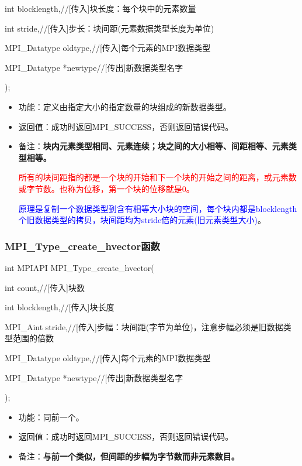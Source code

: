 \documentclass[UTF8]{article}%
\begin{document}
    \qquad int          blocklength,//[传入]块长度：每个块中的元素数量

    \qquad int          stride,//[传入]步长：块间距(元素数据类型长度为单位)

    \qquad MPI\_Datatype oldtype,//[传入]每个元素的MPI数据类型

    \qquad MPI\_Datatype *newtype//[传出]新数据类型名字

);

\begin{itemize}
    \item 功能：定义由指定大小的指定数量的块组成的新数据类型。
    \item 返回值：成功时返回MPI\_SUCCESS，否则返回错误代码。
    \item 备注：\textbf{块内元素类型相同、元素连续；块之间的大小相等、间距相等、元素类型相等。}
    
    \textcolor{red}{所有的块间距指的都是一个块的开始和下一个块的开始之间的距离，或元素数或字节数。也称为位移，第一个块的位移就是0。}

    \textcolor{blue}{原理是复制一个数据类型到含有相等大小块的空间，每个块内都是blocklength个旧数据类型的拷贝，块间距均为stride倍的元素(旧元素类型大小)}。

\end{itemize}

\subsubsection{MPI\_Type\_create\_hvector函数}

int MPIAPI MPI\_Type\_create\_hvector(

    \qquad int          count,//[传入]块数

    \qquad int          blocklength,//[传入]块长度

    \qquad MPI\_Aint    stride,//[传入]步幅：块间距(字节为单位)，注意步幅必须是旧数据类型范围的倍数

    \qquad MPI\_Datatype oldtype,//[传入]每个元素的MPI数据类型

    \qquad MPI\_Datatype *newtype//[传出]新数据类型名字

);

\begin{itemize}
    \item 功能：同前一个。
    \item 返回值：成功时返回MPI\_SUCCESS，否则返回错误代码。
    \item 备注：\textbf{与前一个类似，但间距的步幅为字节数而非元素数目。}
\end{itemize}
\end{document}
